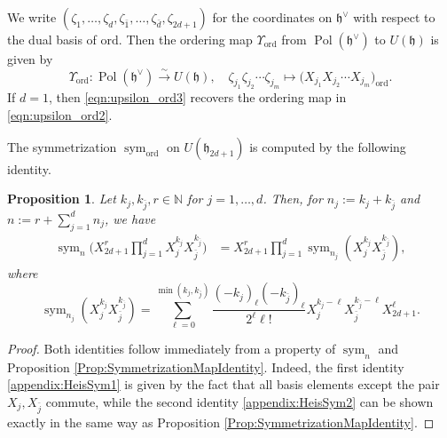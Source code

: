\documentclass[a4paper,11pt,reqno]{amsart}
\newcommand{\frakh}{\mathfrak{h}}
\newcommand{\0}{{\bf 0}}
\newcommand{\N}{\mathbb{N}}
\newcommand{\1}{{\bf 1}}
\DeclareMathOperator{\Pol}{Pol}
\newcommand{\ord}{{\mathrm{ord}}}
\DeclareMathOperator{\sym}{sym}
\theoremstyle{plain}
\newtheorem{proposition}[equation]{Proposition}
\theoremstyle{definition}
\numberwithin{equation}{section}
\theoremstyle{definition}
\begin{document}
\begin{appendices}
We write 
$(\zeta_1, \dots, \zeta_d, \zeta_{\bar{1}},\ldots, \zeta_{\bar{d}}, \zeta_{2d+1})$
for the coordinates 
on $\frakh^\vee$ with respect to the 
dual basis of $\ord$.
Then the ordering map 
$\Upsilon_{\ord}$ from $\Pol(\frakh^\vee)$ to $U(\frakh)$ 
is given by
\begin{equation}\label{eqn:upsilon_ord3}
\Upsilon_{\ord} \colon \Pol(\frakh^\vee) \stackrel{\sim}{\to} U(\frakh),
\quad
\zeta_{j_1}\zeta_{j_2}\cdots \zeta_{j_m} 
\longmapsto
\big(X_{j_1}X_{j_2}\cdots X_{j_m}\big)_\ord.
\end{equation}
If $d=1$, then \eqref{eqn:upsilon_ord3} recovers the ordering map in 
\eqref{eqn:upsilon_ord2}.


The symmetrization $\sym_{\ord}$ on $U(\frakh_{2d+1})$ is computed by the following identity.

\begin{proposition}\label{appendix:SymmetrizationMapIdentity}
Let $k_j, k_{\bar{j}} ,r \in \N$ for  $j=1,\ldots, d$. 
Then, for $n_j:=k_j+k_{\bar{j}}$ and $n:=r+\sum_{j=1}^d n_j$,
we have 
\begin{align}\label{appendix:HeisSym1}
\sym_n\big(X_{2d+1}^r\prod_{j=1}^{d}X_j^{k_j}X_{\bar{j}}^{k_{\bar{j}}} \big)
&= X_{2d+1}^r\prod_{j=1}^d \sym_{n_j}(X_j^{k_j}X_{\bar{j}}^{k_{\bar{j}}}),
\end{align}
where
\begin{equation}\label{appendix:HeisSym2}
\sym_{n_j}(X_j^{k_j}X_{\bar{j}}^{k_{\bar{j}}})
=
\sum_{\ell=0}^{\min(k_j,k_{\bar{j}})}
\frac{(-k_{j})_\ell(-k_{\bar{j}})_\ell}{2^\ell \ell!}
X_j^{k_j-\ell}X_{\bar{j}}^{k_{\bar{j}}-\ell}X_{2d+1}^{\ell}.
\end{equation}
\end{proposition}

\begin{proof}
Both identities follow immediately from a property of $\sym_n$ and Proposition \ref{Prop:SymmetrizationMapIdentity}.
Indeed,  the first identity \eqref{appendix:HeisSym1} is given by
the fact that all basis elements except the pair $X_j, X_{\bar{j}}$ commute,
while 
the second identity \eqref{appendix:HeisSym2} can be shown 
exactly in the same way as 
Proposition \ref{Prop:SymmetrizationMapIdentity}.
\end{proof}


\end{appendices}
\end{document}
